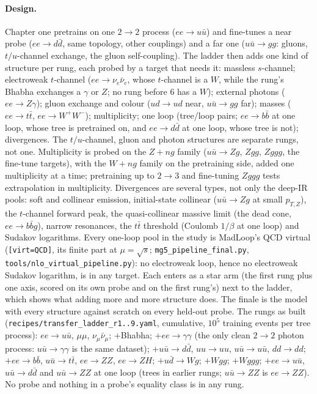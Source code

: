 \documentclass[11pt]{article}
\newcommand{\code}[1]{\texttt{#1}}
\begin{document}
\paragraph{Design.} Chapter one pretrains on one $2\to2$ process ($ee\to u\bar u$) and
fine-tunes a near probe ($ee\to d\bar d$, same topology, other couplings) and a far one
($u\bar u\to gg$: gluons, $t/u$-channel exchange, the gluon self-coupling). The ladder then
adds one kind of structure per rung, each probed by a target that needs it: massless
$s$-channel; electroweak $t$-channel ($ee\to\nu_e\bar\nu_e$, whose $t$-channel is a $W$, while the rung's
Bhabha exchanges a $\gamma$ or $Z$; no rung before $6$ has a $W$); external photons ($ee\to Z\gamma$);
gluon exchange and colour ($ud\to ud$ near, $u\bar u\to gg$ far); masses ($ee\to t\bar t$,
$ee\to W^+W^-$); multiplicity; one loop (tree/loop pairs; $ee\to b\bar b$ at one loop, whose
tree is pretrained on, and $ee\to d\bar d$ at one loop, whose tree is not); divergences.
The $t/u$-channel, gluon and photon structures are separate rungs, not one. Multiplicity
is probed on the $Z+ng$ family ($u\bar u\to Zg$, $Zgg$, $Zggg$, the fine-tune targets), with
the $W+ng$ family on the pretraining side, added one multiplicity at a time; pretraining up to
$2\to3$ and fine-tuning $Zggg$ tests extrapolation in multiplicity. Divergences are several
types, not only the deep-IR pools: soft and collinear emission, initial-state collinear
($u\bar u\to Zg$ at small $p_{T,Z}$), the $t$-channel forward peak, the quasi-collinear massive
limit (the dead cone, $ee\to b\bar bg$), narrow resonances, the $t\bar t$ threshold (Coulomb
$1/\beta$ at one loop) and Sudakov logarithms. Every one-loop pool in the study is MadLoop's QCD virtual
(\code{[virt=QCD]}, its finite part at $\mu=\sqrt s$; \code{mg5\_pipeline\_final.py}, \code{tools/nlo\_virtual\_pipeline.py}):
no electroweak loop, hence no electroweak Sudakov logarithm, is in any target. Each enters as a star
arm (the first rung plus one axis, scored on its own probe and on the first rung's) next to the
ladder, which shows what adding more and more structure does. The finale is the model with every
structure against scratch on every held-out probe. The rungs as built (\code{recipes/transfer\_ladder\_r1..9.yaml},
cumulative, $10^5$ training events per tree process): $ee\to u\bar u$, $\mu\mu$, $\nu_\mu\bar\nu_\mu$; $+$Bhabha;
$+ee\to\gamma\gamma$ (the only clean $2\to2$ photon process: $u\bar u\to\gamma\gamma$ is the same dataset);
$+u\bar u\to d\bar d$, $uu\to uu$, $u\bar u\to u\bar u$, $dd\to dd$; $+ee\to b\bar b$, $u\bar u\to t\bar t$, $ee\to ZZ$,
$ee\to ZH$; $+u\bar d\to Wg$; $+Wgg$; $+Wggg$; $+ee\to u\bar u$, $u\bar u\to d\bar d$ and $u\bar u\to ZZ$ at one loop
(trees in earlier rungs; $u\bar u\to ZZ$ is $ee\to ZZ$). No probe and nothing in a probe's equality class
is in any rung.
\end{document}
